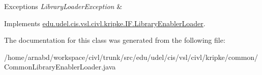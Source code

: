 \begin{DoxyExceptions}{Exceptions}
{\em Library\+Loader\+Exception} & \\
\hline
\end{DoxyExceptions}


Implements \hyperlink{interfaceedu_1_1udel_1_1cis_1_1vsl_1_1civl_1_1kripke_1_1IF_1_1LibraryEnablerLoader_a4a577b2f75edc5a86f2774e13400be43}{edu.\+udel.\+cis.\+vsl.\+civl.\+kripke.\+I\+F.\+Library\+Enabler\+Loader}.



The documentation for this class was generated from the following file\+:\begin{DoxyCompactItemize}
\item 
/home/arnabd/workspace/civl/trunk/src/edu/udel/cis/vsl/civl/kripke/common/Common\+Library\+Enabler\+Loader.\+java\end{DoxyCompactItemize}
